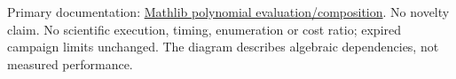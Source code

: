 \documentclass[10pt]{article}
\begin{document}
Primary documentation: \href{https://leanprover-community.github.io/mathlib4_docs/Mathlib/Algebra/Polynomial/Eval/Defs.html}{Mathlib polynomial evaluation/composition}. No novelty claim. No scientific execution, timing, enumeration or cost ratio; expired campaign limits unchanged. The diagram describes algebraic dependencies, not measured performance.
\end{document}
